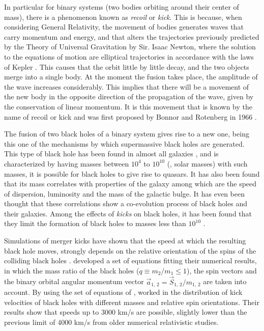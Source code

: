 	In particular for binary systems (two bodies orbiting around their center of mass), there is a phenomenon known as \textit{recoil} or \textit{kick}. This is because, when considering General Relativity, the movement of bodies generates waves that carry momentum and energy, and that alters the trajectories previously predicted by the Theory of Universal Gravitation by Sir. Isaac Newton, where the solution to the equations of motion are elliptical trajectories in accordance with the laws of Kepler \cite{hughes2005black, hoyng2006gravitational, brugmann2018fundamentals}. This causes that the orbit little by little decay, and the two objects merge into a single body. At the moment the fusion takes place, the amplitude of the wave increases considerably. This implies that there will be a movement of the new body in the opposite direction of the propagation of the wave, given by the conservation of linear momentum. It is this movement that is known by the name of recoil or kick and was first proposed by Bonnor and Rotenberg in 1966 \cite{hughes2005black, bonnor1966gravitational}.
	
	The fusion of two black holes of a binary system gives rise to a new one, being this one of the mechanisms by which supermassive black holes are generated. This type of black hole has been found in almost all galaxies \cite{choksi2017recoiling}, and is characterized by having masses between $10^4$ \sm to $10^{10}$ \sm (\sm, solar masses) with such masses, it is possible for black holes to give rise to quasars. It has also been found that its mass correlates with properties of the galaxy among which are the speed of dispersion, luminosity and the mass of the galactic bulge. It has even been thought that these correlations show a co-evolution process of black holes and their galaxies. Among the effects of \textit{kicks} on black holes, it has been found that they limit the formation of black holes to masses less than $10^{10}$ \sm \cite{choksi2017recoiling}.
	
	Simulations of merger kicks have shown that the speed at which the resulting black hole moves, strongly depends on the relative orientation of the spins of the colliding black holes \cite{baker2008modeling}. \citeauthor{baker2008modeling} developed a set of equations fitting their numerical results, in which the mass ratio of the black holes ($q \equiv m_2 / m_1 \leq 1$), the spin vectors and the binary orbital angular momentum vector $\vec{a}_\text{1, 2} = \vec{S}_\text{1, 2}/m_\text{1, 2}$ are taken into account. By using the set of equations of \citeauthor{baker2008modeling}, \citeauthor{tanaka2009assembly} worked in the distribution of kick velocities of black holes with different masses and relative spin orientations. Their results show that speeds up to 3000 km/s are possible, slightly lower than the previous limit of 4000 km/s from older numerical relativistic studies.
	
